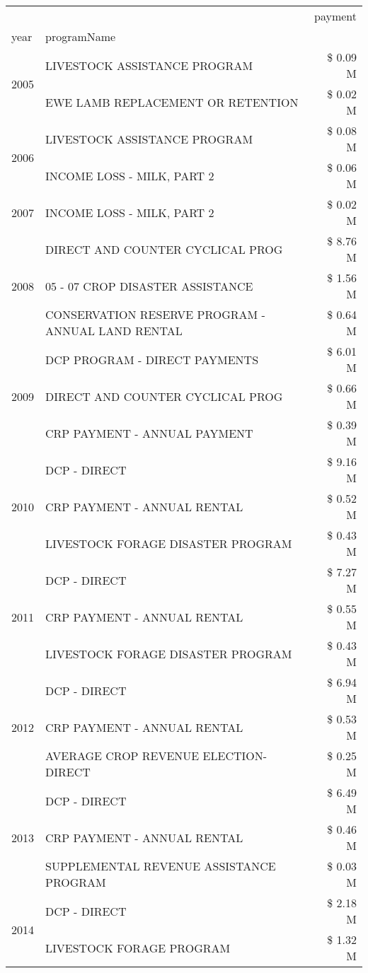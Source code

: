 \begin{tabular}{llr}
\toprule
 &  & payment \\
year & programName &  \\
\midrule
\multirow[t]{2}{*}{2005} & LIVESTOCK ASSISTANCE PROGRAM & \$ 0.09 M \\
 & EWE LAMB REPLACEMENT OR RETENTION & \$ 0.02 M \\
\cline{1-3}
\multirow[t]{2}{*}{2006} & LIVESTOCK ASSISTANCE PROGRAM & \$ 0.08 M \\
 & INCOME LOSS - MILK, PART 2 & \$ 0.06 M \\
\cline{1-3}
2007 & INCOME LOSS - MILK, PART 2 & \$ 0.02 M \\
\cline{1-3}
\multirow[t]{3}{*}{2008} & DIRECT AND COUNTER CYCLICAL PROG & \$ 8.76 M \\
 & 05 - 07 CROP DISASTER ASSISTANCE & \$ 1.56 M \\
 & CONSERVATION RESERVE PROGRAM - ANNUAL LAND RENTAL & \$ 0.64 M \\
\cline{1-3}
\multirow[t]{3}{*}{2009} & DCP PROGRAM - DIRECT PAYMENTS & \$ 6.01 M \\
 & DIRECT AND COUNTER CYCLICAL PROG & \$ 0.66 M \\
 & CRP PAYMENT - ANNUAL PAYMENT & \$ 0.39 M \\
\cline{1-3}
\multirow[t]{3}{*}{2010} & DCP - DIRECT & \$ 9.16 M \\
 & CRP PAYMENT - ANNUAL RENTAL & \$ 0.52 M \\
 & LIVESTOCK FORAGE DISASTER PROGRAM & \$ 0.43 M \\
\cline{1-3}
\multirow[t]{3}{*}{2011} & DCP - DIRECT & \$ 7.27 M \\
 & CRP PAYMENT - ANNUAL RENTAL & \$ 0.55 M \\
 & LIVESTOCK FORAGE DISASTER PROGRAM & \$ 0.43 M \\
\cline{1-3}
\multirow[t]{3}{*}{2012} & DCP - DIRECT & \$ 6.94 M \\
 & CRP PAYMENT - ANNUAL RENTAL & \$ 0.53 M \\
 & AVERAGE CROP REVENUE ELECTION-DIRECT & \$ 0.25 M \\
\cline{1-3}
\multirow[t]{3}{*}{2013} & DCP - DIRECT & \$ 6.49 M \\
 & CRP PAYMENT - ANNUAL RENTAL & \$ 0.46 M \\
 & SUPPLEMENTAL REVENUE ASSISTANCE PROGRAM & \$ 0.03 M \\
\cline{1-3}
\multirow[t]{3}{*}{2014} & DCP - DIRECT & \$ 2.18 M \\
 & LIVESTOCK FORAGE PROGRAM & \$ 1.32 M \\

\end{tabular}
